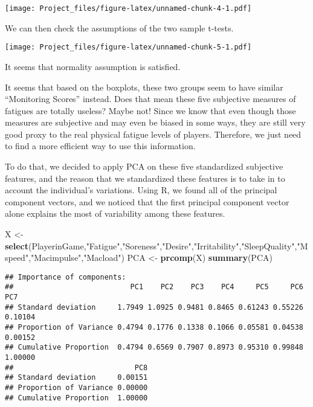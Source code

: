 \documentclass[]{article}
\newenvironment{Shaded}{\begin{snugshade}}{\end{snugshade}}
\newcommand{\KeywordTok}[1]{\textcolor[rgb]{0.13,0.29,0.53}{\textbf{#1}}}
\newcommand{\NormalTok}[1]{#1}
\newcommand{\StringTok}[1]{\textcolor[rgb]{0.31,0.60,0.02}{#1}}
\begin{document}
\texttt{[image: Project\_files/figure-latex/unnamed-chunk-4-1.pdf]}

We can then check the assumptions of the two sample t-tests.

\texttt{[image: Project\_files/figure-latex/unnamed-chunk-5-1.pdf]}

It seems that normality assumption is satisfied.

It seems that based on the boxplots, these two groups seem to have
similar ``Monitoring Scores'' instead. Does that mean these five
subjective measures of fatigues are totally useless? Maybe not! Since we
know that even though those measures are subjective and may even be
biased in some ways, they are still very good proxy to the real physical
fatigue levels of players. Therefore, we just need to find a more
efficient way to use this information.

To do that, we decided to apply PCA on these five standardized
subjective features, and the reason that we standardized these features
is to take in to account the individual's variations. Using R, we found
all of the principal component vectors, and we noticed that the first
principal component vector alone explains the most of variability among
these features.

\begin{Shaded}
\begin{Highlighting}[]
\NormalTok{X <-}\StringTok{ }\KeywordTok{select}\NormalTok{(PlayerinGame,}\StringTok{"Fatigue"}\NormalTok{,}\StringTok{"Soreness"}\NormalTok{,}\StringTok{"Desire"}\NormalTok{,}\StringTok{"Irritability"}\NormalTok{,}\StringTok{"SleepQuality"}\NormalTok{,}\StringTok{"Mspeed"}\NormalTok{,}\StringTok{"Macimpulse"}\NormalTok{,}\StringTok{"Macload"}\NormalTok{)}
\NormalTok{PCA <-}\StringTok{ }\KeywordTok{prcomp}\NormalTok{(X)}
\KeywordTok{summary}\NormalTok{(PCA)}
\end{Highlighting}
\end{Shaded}

\begin{verbatim}
## Importance of components:
##                           PC1    PC2    PC3    PC4     PC5     PC6     PC7
## Standard deviation     1.7949 1.0925 0.9481 0.8465 0.61243 0.55226 0.10104
## Proportion of Variance 0.4794 0.1776 0.1338 0.1066 0.05581 0.04538 0.00152
## Cumulative Proportion  0.4794 0.6569 0.7907 0.8973 0.95310 0.99848 1.00000
##                            PC8
## Standard deviation     0.00151
## Proportion of Variance 0.00000
## Cumulative Proportion  1.00000
\end{verbatim}
\end{document}
